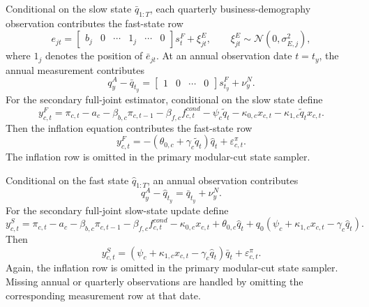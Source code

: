 \documentclass[11pt]{article}
\newcommand{\Normal}{\mathcal{N}}
\begin{document}
Conditional on the slow state \(\bar q_{1:T}\), each quarterly business-demography observation contributes the fast-state row
\begin{equation}
e_{jt}
=
\begin{bmatrix}
b_j & 0 & \cdots & 1_j & \cdots & 0
\end{bmatrix}
s_t^F+\xi_{jt}^E,
\qquad
\xi_{jt}^E\sim\Normal(0,\sigma_{E,j}^2),
\end{equation}
where \(1_j\) denotes the position of \(\bar e_{jt}\). At an annual observation date \(t=t_y\), the annual measurement contributes
\begin{equation}
q_y^A-\bar q_{t_y}
=
\begin{bmatrix}
1 & 0 & \cdots & 0
\end{bmatrix}s_{t_y}^F+\nu_y^N.
\end{equation}
For the secondary full-joint estimator, conditional on the slow state define
\begin{equation}
y_{c,t}^F
=
\pi_{c,t}
-a_c
-\beta_{b,c}\pi_{c,t-1}
-\beta_{f,c}f_{c,t}^{cond}
-\psi_c\tilde q_t
-\kappa_{0,c}x_{c,t}
-\kappa_{1,c}\tilde q_tx_{c,t}.
\end{equation}
Then the inflation equation contributes the fast-state row
\begin{equation}
y_{c,t}^F
=
-\left(\theta_{0,c}+\gamma_c\tilde q_t\right)\hat q_t
+\varepsilon_{c,t}^{\pi}.
\label{eq:fast_ffbs_inflation_row}
\end{equation}
The inflation row is omitted in the primary modular-cut state sampler.

Conditional on the fast state \(\hat q_{1:T}\), an annual observation contributes
\begin{equation}
q_y^A-\hat q_{t_y}=\bar q_{t_y}+\nu_y^N.
\end{equation}
For the secondary full-joint slow-state update define
\begin{equation}
y_{c,t}^S
=
\pi_{c,t}
-a_c
-\beta_{b,c}\pi_{c,t-1}
-\beta_{f,c}f_{c,t}^{cond}
-\kappa_{0,c}x_{c,t}
+\theta_{0,c}\hat q_t
+q_0\left(\psi_c+\kappa_{1,c}x_{c,t}-\gamma_c\hat q_t\right).
\end{equation}
Then
\begin{equation}
y_{c,t}^S
=
\left(\psi_c+\kappa_{1,c}x_{c,t}-\gamma_c\hat q_t\right)\bar q_t
+\varepsilon_{c,t}^{\pi}.
\label{eq:slow_ffbs_inflation_row}
\end{equation}
Again, the inflation row is omitted in the primary modular-cut state sampler. Missing annual or quarterly observations are handled by omitting the corresponding measurement row at that date.
\end{document}
